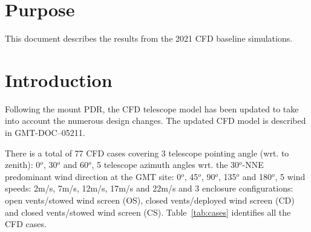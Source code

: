 \section{Purpose}
\label{sec:purpose}

This document describes the results from the 2021 CFD baseline simulations.

\section{Introduction}

Following the mount PDR\cite{MOUNT-PDR}, the CFD telescope model has been updated to take
into account the numerous design changes.
The updated CFD model is described in GMT-DOC--05211\cite{GMT.DOC.05211}.

There is a total of 77 CFD cases covering 3 telescope pointing angle (wrt. to zenith): 0$^o$, 30$^o$ and 60$^o$, 5 telescope azimuth angles wrt. the 30$^o$-NNE predominant wind direction at the GMT site: 0$^o$, 45$^o$, 90$^o$, 135$^o$ and 180$^o$, 5 wind speeds: 2m/s, 7m/s, 12m/s, 17m/s and 22m/s and 3 enclosure configurations: open vents/stowed wind screen (OS), closed vents/deployed wind screen (CD) and closed vents/stowed wind screen (CS).
Table~\ref{tab:cases} identifies all the CFD cases.
